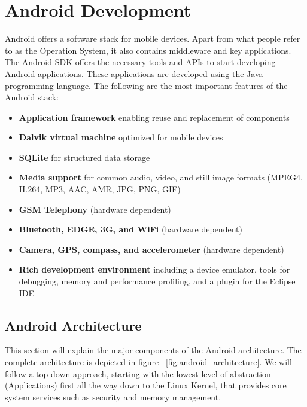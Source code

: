 \chapter{Android Development}

Android offers a software stack for mobile devices. Apart from what people refer to as the Operation System, it also contains middleware and key applications. The Android SDK offers the necessary tools and APIs to start developing Android applications. These applications are developed using the Java programming language. The following are the most important features of the Android stack:

\begin{itemize}
\item{\textbf{Application framework} enabling reuse and replacement of components}
\item{\textbf{Dalvik virtual machine} optimized for mobile devices}
\item{\textbf{SQLite} for structured data storage}
\item{\textbf{Media support} for common audio, video, and still image formats (MPEG4, H.264, MP3, AAC, AMR, JPG, PNG, GIF)}
\item{\textbf{GSM Telephony} (hardware dependent)}
\item{\textbf{Bluetooth, EDGE, 3G, and WiFi} (hardware dependent)}
\item{\textbf{Camera, GPS, compass, and accelerometer} (hardware dependent)}
\item{\textbf{Rich development environment} including a device emulator, tools for debugging, memory and performance profiling, and a plugin for the Eclipse IDE}
\end{itemize}

\section{Android Architecture}

This section will explain the major components of the Android architecture. The complete architecture is depicted in figure ~\ref{fig:android_architecture}. We will follow a top-down approach, starting with the lowest level of abstraction (Applications) first all the way down to the Linux Kernel, that provides core system services such as security and memory management.

